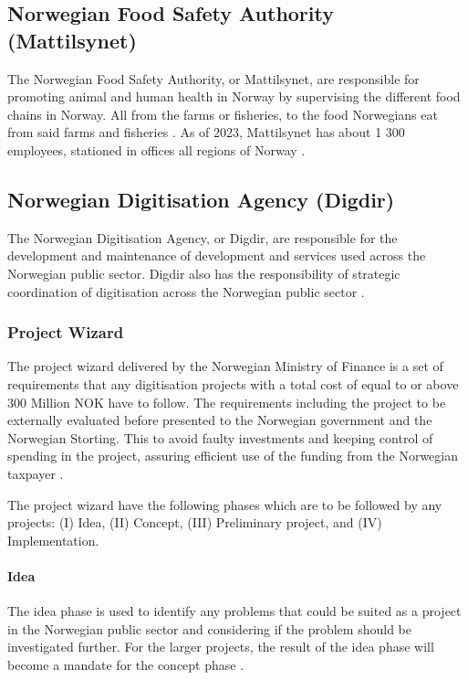 \subsection{Norwegian Food Safety Authority (Mattilsynet)}
The Norwegian Food Safety Authority, or Mattilsynet, are responsible for promoting animal and human health in Norway by supervising the different food chains in Norway. All from the farms or fisheries, to the food Norwegians eat from said farms and fisheries \cite{mat_r_2023}. As of 2023, Mattilsynet has about 1 300 employees, stationed in offices all regions of Norway \cite{org_mat_2023}.

\subsection{Norwegian Digitisation Agency (Digdir)}
The Norwegian Digitisation Agency, or Digdir, are responsible for the development and maintenance of development and services used across the Norwegian public sector. Digdir also has the responsibility of strategic coordination of digitisation across the Norwegian public sector \cite{digdir_r_2023}.

\subsubsection{Project Wizard}
The project wizard delivered by the Norwegian Ministry of Finance is a set of requirements that any digitisation projects with a total cost of equal to or above 300 Million NOK have to follow. The requirements including the project to be externally evaluated before presented to the Norwegian government and the Norwegian Storting. This to avoid faulty investments and keeping control of spending in the project, assuring efficient use of the funding from the Norwegian taxpayer \cite{project_wizard_r_2019}.

The project wizard have the following phases which are to be followed by any projects: (I) Idea, (II) Concept, (III) Preliminary project, and (IV) Implementation.

\paragraph{Idea}
The idea phase is used to identify any problems that could be suited as a project in the Norwegian public sector and considering if the problem should be investigated further. For the larger projects, the result of the idea phase will become a mandate for the concept phase \cite{project_wizard_r_2019}.

